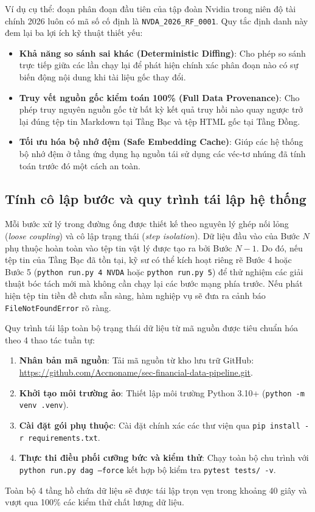 Ví dụ cụ thể: đoạn phân đoạn đầu tiên của tập đoàn Nvidia trong niên độ tài chính 2026 luôn có mã số cố định là \texttt{NVDA\_2026\_RF\_0001}. Quy tắc định danh này đem lại ba lợi ích kỹ thuật thiết yếu:
\begin{itemize}
    \item \textbf{Khả năng so sánh sai khác (Deterministic Diffing)}: Cho phép so sánh trực tiếp giữa các lần chạy lại để phát hiện chính xác phân đoạn nào có sự biến động nội dung khi tài liệu gốc thay đổi.
    \item \textbf{Truy vết nguồn gốc kiểm toán 100\% (Full Data Provenance)}: Cho phép truy nguyên nguồn gốc từ bất kỳ kết quả truy hồi nào quay ngược trở lại đúng tệp tin Markdown tại Tầng Bạc và tệp HTML gốc tại Tầng Đồng.
    \item \textbf{Tối ưu hóa bộ nhớ đệm (Safe Embedding Cache)}: Giúp các hệ thống bộ nhớ đệm ở tầng ứng dụng hạ nguồn tái sử dụng các véc-tơ nhúng đã tính toán trước đó một cách an toàn.
\end{itemize}

\subsection{Tính cô lập bước và quy trình tái lập hệ thống}
Mỗi bước xử lý trong đường ống được thiết kế theo nguyên lý ghép nối lỏng (\textit{loose coupling}) và cô lập trạng thái (\textit{step isolation}). Dữ liệu đầu vào của Bước $N$ phụ thuộc hoàn toàn vào tệp tin vật lý được tạo ra bởi Bước $N-1$. Do đó, nếu tệp tin của Tầng Bạc đã tồn tại, kỹ sư có thể kích hoạt riêng rẽ Bước 4 hoặc Bước 5 (\texttt{python run.py 4 NVDA} hoặc \texttt{python run.py 5}) để thử nghiệm các giải thuật bóc tách mới mà không cần chạy lại các bước mạng phía trước. Nếu phát hiện tệp tin tiền đề chưa sẵn sàng, hàm nghiệp vụ sẽ đưa ra cảnh báo \texttt{FileNotFoundError} rõ ràng.

Quy trình tái lập toàn bộ trạng thái dữ liệu từ mã nguồn được tiêu chuẩn hóa theo 4 thao tác tuần tự:
\begin{enumerate}
    \item \textbf{Nhân bản mã nguồn}: Tải mã nguồn từ kho lưu trữ GitHub:\\ \url{https://github.com/Accnoname/sec-financial-data-pipeline.git}.
    \item \textbf{Khởi tạo môi trường ảo}: Thiết lập môi trường Python 3.10+ (\texttt{python -m venv .venv}).
    \item \textbf{Cài đặt gói phụ thuộc}: Cài đặt chính xác các thư viện qua \texttt{pip install -r requirements.txt}.
    \item \textbf{Thực thi điều phối cưỡng bức và kiểm thử}: Chạy toàn bộ chu trình với \texttt{python run.py dag --force} kết hợp bộ kiểm tra \texttt{pytest tests/ -v}.
\end{enumerate}
Toàn bộ 4 tầng hồ chứa dữ liệu sẽ được tái lập trọn vẹn trong khoảng 40 giây và vượt qua 100\% các kiểm thử chất lượng dữ liệu.
